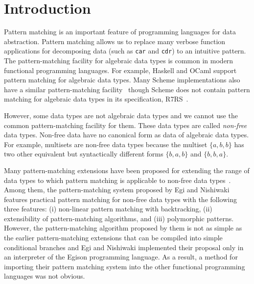 \documentclass[acmlarge]{acmart}
\begin{document}


\maketitle

\section{Introduction}\label{intro}

Pattern matching is an important feature of programming languages for data abstraction.
Pattern matching allows us to replace many verbose function applications for decomposing data (such as \lstinline{car} and \lstinline{cdr}) to an intuitive pattern.
The pattern-matching facility for algebraic data types is common in modern functional programming languages.
For example, Haskell and OCaml support pattern matching for algebraic data types.
Many Scheme implementations also have a similar pattern-matching facility~\cite{gauchePM} though Scheme does not contain pattern matching for algebraic data types in its specification, R7RS~\cite{shinn2013revised}.

However, some data types are not algebraic data types and we cannot use the common pattern-matching facility for them.
These data types are called \emph{non-free} data types.
Non-free data have no canonical form as data of algebraic data types.
For example, multisets are non-free data types because the multiset $\{a,b,b\}$ has two other equivalent but syntactically different forms $\{b,a,b\}$ and $\{b,b,a\}$.

Many pattern-matching extensions have been proposed for extending the range of data types to which pattern matching is applicable to non-free data types~\cite{Hudak07ahistory,turner2012some}.
Among them, the pattern-matching system proposed by Egi and Nishiwaki~\cite{egi2018aplas} features practical pattern matching for non-free data types with the following three features: (i) non-linear pattern matching with backtracking, (ii) extensibility of pattern-matching algorithms, and (iii) polymorphic patterns.
However, the pattern-matching algorithm proposed by them is not as simple as the earlier pattern-matching extensions that can be compiled into simple conditional branches and Egi and Nishiwaki implemented their proposal only in an interpreter of the Egison programming language.
As a result, a method for importing their pattern matching system into the other functional programming languages was not obvious.
\end{document}
